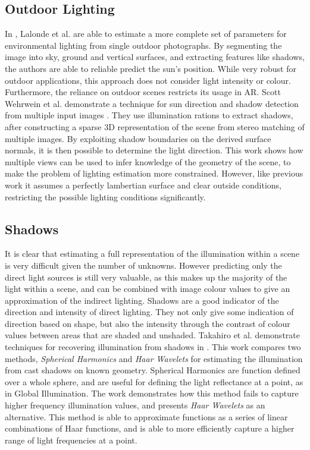 \documentclass[ %
                    author={Gavin Parker},
                supervisor={Dr. Neill Campbell},
                    degree={MEng},
                     title={Deep Siamese Networks for Illumination Estimation from Stereo Images},
                  subtitle={},
                      type={research},
                      year={2018} ]{dissertation}
\begin{document}
\subsection{Outdoor Lighting}
In \cite{Lalonde-2009-10350}, Lalonde et al. are able to estimate a more complete set of parameters for environmental lighting from single outdoor photographs. By segmenting the image into sky, ground and vertical surfaces, and extracting features like shadows, the authors are able to reliable predict the sun's position. While very robust for outdoor applications, this approach does not consider light intensity or colour. Furthermore, the reliance on outdoor scenes restricts its usage in AR.
Scott Wehrwein et al. demonstrate a technique for sun direction and shadow detection from multiple input images \cite{7335515}. They use illumination rations to extract shadows, after constructing a sparse 3D representation of the scene from stereo matching of multiple images. By exploiting shadow boundaries on the derived surface normals, it is then possible to determine the light direction. This work shows how multiple views can be used to infer knowledge of the geometry of the scene, to make the problem of lighting estimation more constrained. However, like previous work it assumes a perfectly lambertian surface and clear outside conditions, restricting the possible lighting conditions significantly.
\subsection{Shadows}
It is clear that estimating a full representation of the illumination within a scene is very difficult given the number of unknowns. However predicting only the direct light sources is still very valuable, as this makes up the majority of the light within a scene, and can be combined with image colour values to give an approximation of the indirect lighting. Shadows are a good indicator of the direction and intensity of direct lighting. They not only give some indication of direction based on shape, but also the intensity through the contrast of colour values between areas that are shaded and unshaded. Takahiro et al. demonstrate techniques for recovering illumination from shadows in \cite{1315013}. This work compares two methods, \textit{Spherical Harmonics} and \textit{Haar Wavelets} for estimating the illumination from cast shadows on known geometry. Spherical Harmonics are function defined over a whole sphere, and are useful for defining the light reflectance at a point, as in Global Illumination. The work demonstrates how this method fails to capture higher frequency illumination values, and presents \textit{Haar Wavelets} as an alternative. This method is able to approximate functions as a series of linear combinations of Haar functions, and is able to more efficiently capture a higher range of light frequencies at a point.
\end{document}
